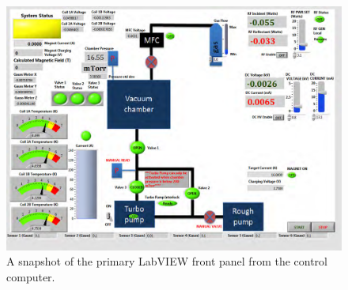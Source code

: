 \begin{figure}[h]
\begin{center}
\includegraphics[width=6in]{figures/mdpx_labview.png}
\caption{A snapshot of the primary LabVIEW front panel from the control computer.\label{mdpx-labview}}
\end{center}
\end{figure}







